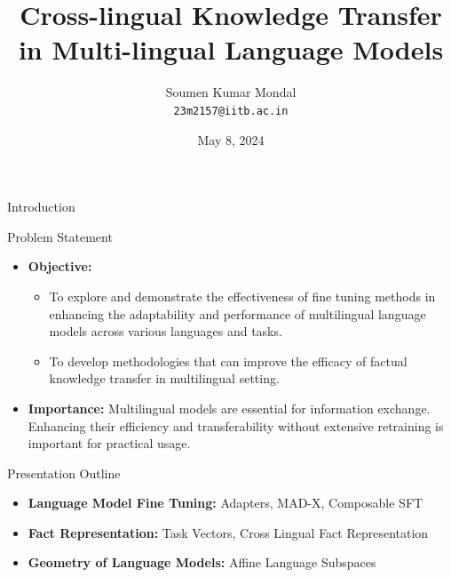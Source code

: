 \documentclass{beamer}
\title[DS 694: Seminar]{Cross-lingual Knowledge Transfer in Multi-lingual Language Models}
\author[Soumen Mondal]{Soumen Kumar Mondal\\\texttt{23m2157@iitb.ac.in}}
\institute[IIT Bombay]{Guide: Prof. Preethi Jyothi\\\;\\Indian Institute of Technology Bombay}
\date{May 8, 2024}
\begin{document}
	\begin{frame}
		\titlepage
	\end{frame}
	
	\begin{frame}{Introduction}
		\begin{block}{\scriptsize Problem Statement}\scriptsize
			\begin{itemize}
				\item \textbf{Objective:} 
				\begin{itemize}\scriptsize
					\item To explore and demonstrate the effectiveness of fine tuning methods in enhancing the adaptability and performance of multilingual language models across various languages and tasks.
					\item To develop methodologies that can improve the efficacy of factual knowledge transfer in multilingual setting.
				\end{itemize}				
				\item \textbf{Importance:} Multilingual models are essential for information exchange. Enhancing their efficiency and transferability without extensive retraining is important for practical usage.
			\end{itemize}
		\end{block}
		\begin{block}{\scriptsize Presentation Outline}\scriptsize
			\begin{itemize}
				\item \textbf{Language Model Fine Tuning:} Adapters, MAD-X, Composable SFT
				\item \textbf{Fact Representation:} Task Vectors, Cross Lingual Fact Representation
				\item \textbf{Geometry of Language Models:} Affine Language Subspaces
			\end{itemize}
		\end{block}
	\end{frame}
	
\end{document}
